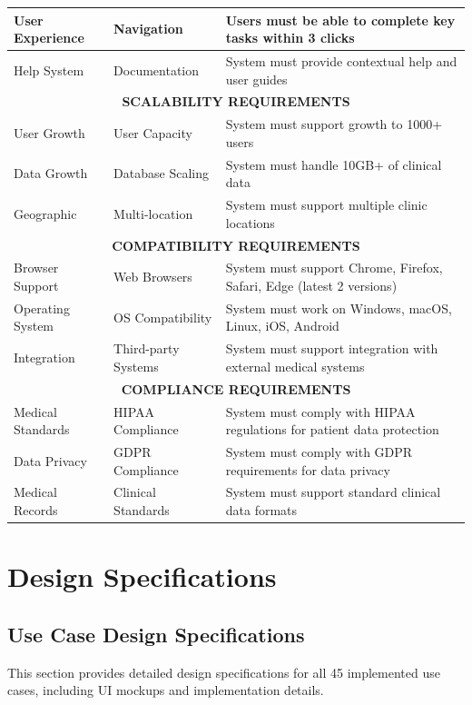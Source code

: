 \documentclass[12pt,a4paper]{article}
\begin{document}
\begin{longtable}{|p{2cm}|p{3cm}|p{9cm}|}
\hline
User Experience & Navigation & Users must be able to complete key tasks within 3 clicks \\
\hline
Help System & Documentation & System must provide contextual help and user guides \\
\hline
\multicolumn{3}{|c|}{\textbf{SCALABILITY REQUIREMENTS}} \\
\hline
User Growth & User Capacity & System must support growth to 1000+ users \\
\hline
Data Growth & Database Scaling & System must handle 10GB+ of clinical data \\
\hline
Geographic & Multi-location & System must support multiple clinic locations \\
\hline
\multicolumn{3}{|c|}{\textbf{COMPATIBILITY REQUIREMENTS}} \\
\hline
Browser Support & Web Browsers & System must support Chrome, Firefox, Safari, Edge (latest 2 versions) \\
\hline
Operating System & OS Compatibility & System must work on Windows, macOS, Linux, iOS, Android \\
\hline
Integration & Third-party Systems & System must support integration with external medical systems \\
\hline
\multicolumn{3}{|c|}{\textbf{COMPLIANCE REQUIREMENTS}} \\
\hline
Medical Standards & HIPAA Compliance & System must comply with HIPAA regulations for patient data protection \\
\hline
Data Privacy & GDPR Compliance & System must comply with GDPR requirements for data privacy \\
\hline
Medical Records & Clinical Standards & System must support standard clinical data formats \\
\hline
\end{longtable}

\section{Design Specifications}

\subsection{Use Case Design Specifications}

This section provides detailed design specifications for all 45 implemented use cases, including UI mockups and implementation details.
\end{document}
